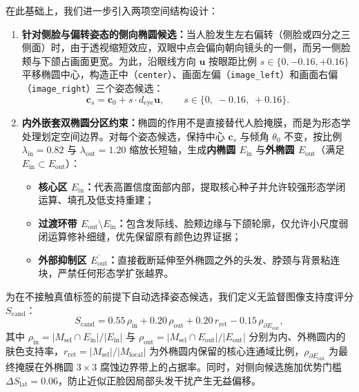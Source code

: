 在此基础上，我们进一步引入两项空间结构设计：
\begin{enumerate}
\item \textbf{针对侧脸与偏转姿态的侧向椭圆候选：}当人脸发生左右偏转（侧脸或四分之三侧面）时，由于透视缩短效应，双眼中点会偏向朝向镜头的一侧，而另一侧脸颊与下颌占画面更宽。为此，沿眼线方向 $\mathbf{u}$ 按眼距比例 $s\in\{0, -0.16, +0.16\}$ 平移椭圆中心，构造正中（\texttt{center}）、画面左偏（\texttt{image\_left}）和画面右偏（\texttt{image\_right}）三个姿态候选：
\begin{equation}
\mathbf{c}_s = \mathbf{c}_0 + s \cdot d_{\text{eye}}\mathbf{u}, \qquad s \in \{0,\; -0.16,\; +0.16\}.
\label{eq:poseshift}
\end{equation}
\item \textbf{内外嵌套双椭圆分区约束：}椭圆的作用不是直接替代人脸掩膜，而是为形态学处理划定空间边界。对每个姿态候选，保持中心 $\mathbf{c}_s$ 与倾角 $\theta_0$ 不变，按比例 $\lambda_{\text{in}}=0.82$ 与 $\lambda_{\text{out}}=1.20$ 缩放长短轴，生成\textbf{内椭圆 $E_{\text{in}}$} 与\textbf{外椭圆 $E_{\text{out}}$}（满足 $E_{\text{in}}\subset E_{\text{out}}$）：
\begin{itemize}
\item \textbf{核心区 $E_{\text{in}}$：}代表高置信度面部内部，提取核心种子并允许较强形态学闭运算、填孔及低支持重建；
\item \textbf{过渡环带 $E_{\text{out}}\setminus E_{\text{in}}$：}包含发际线、脸颊边缘与下颌轮廓，仅允许小尺度弱闭运算修补细缝，优先保留原有颜色边界证据；
\item \textbf{外部抑制区 $\overline{E_{\text{out}}}$：}直接截断延伸至外椭圆之外的头发、脖颈与背景粘连块，严禁任何形态学扩张越界。
\end{itemize}
\end{enumerate}

为在不接触真值标签的前提下自动选择姿态候选，我们定义无监督图像支持度评分 $S_{\text{cand}}$：
\begin{equation}
S_{\text{cand}} = 0.55\,\rho_{\text{in}} + 0.20\,\rho_{\text{out}} + 0.20\,r_{\text{ret}} - 0.15\,\rho_{\partial E_{\text{out}}},
\label{eq:candscore}
\end{equation}
其中 $\rho_{\text{in}} = |M_{\text{sel}}\cap E_{\text{in}}|/|E_{\text{in}}|$ 与 $\rho_{\text{out}} = |M_{\text{sel}}\cap E_{\text{out}}|/|E_{\text{out}}|$ 分别为内、外椭圆内的肤色支持率，$r_{\text{ret}} = |M_{\text{sel}}|/|M_{\text{local}}|$ 为外椭圆内保留的核心连通域比例，$\rho_{\partial E_{\text{out}}}$ 为最终掩膜在外椭圆 $3\times3$ 腐蚀边界带上的占据率。同时，对侧向候选施加优势门槛 $\Delta S_{\text{lat}}=0.06$，防止近似正脸因局部头发干扰产生无益偏移。

